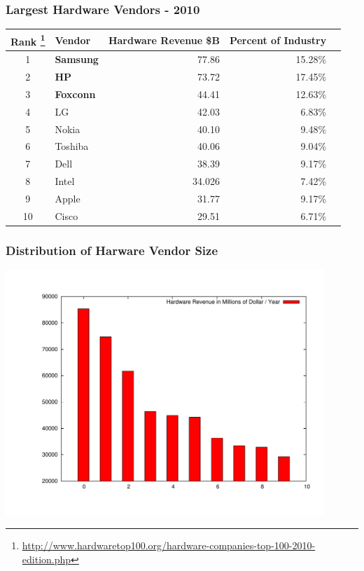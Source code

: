 \documentclass[18pt]{beamer}
\begin{document}
{
\begin{frame}
\frametitle{Largest Hardware Vendors - 2010}

\begin{center}
\begin{tabular}{clrrr}
\hline
  \textbf{Rank
\footnote{
\url{http://www.hardwaretop100.org/hardware-companies-top-100-2010-edition.php}}
} &\textbf{Vendor} &	\textbf{Hardware Revenue \$B} & \textbf{Percent of Industry} \\
\hline
\hline
1 &  \textbf{Samsung} & 77.86 & 15.28\% \\
2 &  \textbf{HP} & 73.72 &  17.45\% \\
3 &  \textbf{Foxconn} & 44.41 &  12.63\% \\
4 &  LG & 42.03 & 6.83\% \\
5 &  Nokia & 40.10 & 9.48\% \\
6 &  Toshiba & 40.06 &  9.04\% \\
7 &  Dell & 38.39 & 9.17\% \\
8 &  Intel & 34.026 &  7.42\% \\
9 &  Apple & 31.77 & 9.17\% \\
10 &  Cisco & 29.51 &  6.71\% \\
\end{tabular}

\end{center}
\end{frame}
}
\begin{frame}
\frametitle{Distribution of Harware Vendor Size}
  \includegraphics[width=0.9\textwidth,height=0.9\paperheight]{../Art/LargestHardwareVendorsPlot.pdf}
\end{frame}
\end{document}
